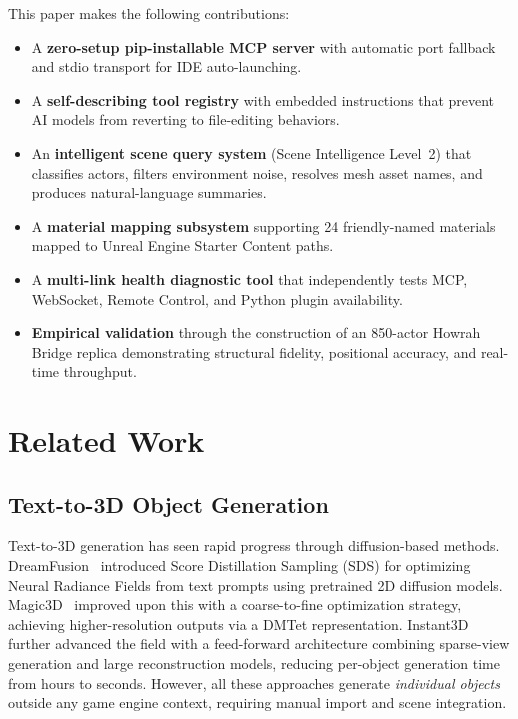 \documentclass[conference]{IEEEtran}
\begin{document}
This paper makes the following contributions:

\begin{itemize}[leftmargin=*]
    \item A \textbf{zero-setup pip-installable MCP server} with automatic port fallback and stdio transport for IDE auto-launching.
    \item A \textbf{self-describing tool registry} with embedded instructions that prevent AI models from reverting to file-editing behaviors.
    \item An \textbf{intelligent scene query system} (Scene Intelligence Level~2) that classifies actors, filters environment noise, resolves mesh asset names, and produces natural-language summaries.
    \item A \textbf{material mapping subsystem} supporting 24 friendly-named materials mapped to Unreal Engine Starter Content paths.
    \item A \textbf{multi-link health diagnostic tool} that independently tests MCP, WebSocket, Remote Control, and Python plugin availability.
    \item \textbf{Empirical validation} through the construction of an 850-actor Howrah Bridge replica demonstrating structural fidelity, positional accuracy, and real-time throughput.
\end{itemize}

\section{Related Work}

\subsection{Text-to-3D Object Generation}

Text-to-3D generation has seen rapid progress through diffusion-based methods. DreamFusion~\cite{poole2023dreamfusion} introduced Score Distillation Sampling (SDS) for optimizing Neural Radiance Fields from text prompts using pretrained 2D diffusion models. Magic3D~\cite{lin2023magic3d} improved upon this with a coarse-to-fine optimization strategy, achieving higher-resolution outputs via a DMTet representation. Instant3D~\cite{li2024instant3d} further advanced the field with a feed-forward architecture combining sparse-view generation and large reconstruction models, reducing per-object generation time from hours to seconds. However, all these approaches generate \textit{individual objects} outside any game engine context, requiring manual import and scene integration.
\end{document}
